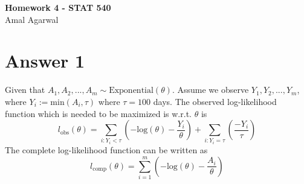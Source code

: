 \documentclass[12pt]{article}
\date{}
\begin{document}

\newtheorem{thm}{Theorem}[section]
\newtheorem{cor}[thm]{Corollary}
\newtheorem{lem}[thm]{Lemma}
\newtheorem{prop}[thm]{Proposition}
\newtheorem{defn}[thm]{Definition}
\newtheorem{exam}[thm]{Example}
\newtheorem{qstn}[thm]{Question}

\newpage
\begin{center}
{\bf Homework 4 - STAT 540}\\
Amal Agarwal
\end{center}
\section*{Answer 1}
Given that $A_1, A_2, ..., A_m \sim \text{Exponential}(\theta)$. Assume we observe $Y_1, Y_2, ..., Y_m$, where $Y_i:=\text{min}(A_i,\tau)$ where $\tau=100$ days. The observed log-likelihood function which is needed to be maximized is w.r.t. $\theta$ is \[l_{\text{obs}}(\theta)=\sum\limits_{i: Y_i<\tau}\left(-\text{log}(\theta)-\dfrac{Y_i}{\theta}\right)+\sum\limits_{i: Y_i=\tau}\left(\dfrac{-Y_i}{\tau}\right)\] 
The complete log-likelihood function can be written as
\[l_{\text{comp}}(\theta)=\sum\limits_{i=1}^m\left(-\text{log}(\theta)-\dfrac{A_i}{\theta}\right)\]
\end{document}
